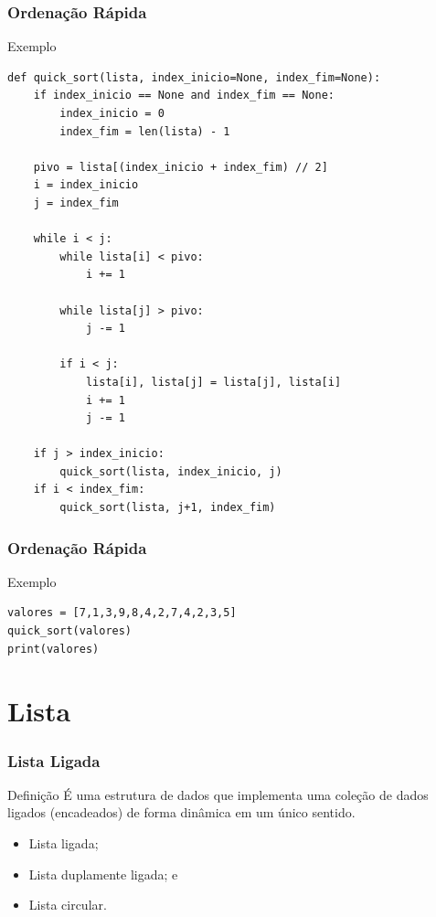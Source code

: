 \documentclass{beamer}
\begin{document}
\begin{frame}[fragile]
\frametitle{Ordenação Rápida}

\begin{exampleblock}{Exemplo}
	\begin{lstlisting}
def quick_sort(lista, index_inicio=None, index_fim=None):
    if index_inicio == None and index_fim == None:
        index_inicio = 0
        index_fim = len(lista) - 1

    pivo = lista[(index_inicio + index_fim) // 2]
    i = index_inicio
    j = index_fim

    while i < j:
        while lista[i] < pivo:
            i += 1

        while lista[j] > pivo:
            j -= 1

        if i < j:    
            lista[i], lista[j] = lista[j], lista[i]
            i += 1
            j -= 1

    if j > index_inicio:
        quick_sort(lista, index_inicio, j)
    if i < index_fim:
        quick_sort(lista, j+1, index_fim)
	\end{lstlisting}
\end{exampleblock}
\end{frame}

\begin{frame}[fragile]
\frametitle{Ordenação Rápida}

\begin{exampleblock}{Exemplo}
	\begin{lstlisting}
valores = [7,1,3,9,8,4,2,7,4,2,3,5]
quick_sort(valores)
print(valores)
	\end{lstlisting}
\end{exampleblock}
\end{frame}

\section{Lista}

\begin{frame}
\frametitle{Lista Ligada}

\begin{block}{Definição}
É uma estrutura de dados que implementa uma coleção de dados ligados (encadeados) de forma dinâmica em um único sentido.
\end{block} \vfill

\begin{itemize}
	\item Lista ligada;
	\item Lista duplamente ligada; e
	\item Lista circular.
\end{itemize}
\end{frame}
\end{document}
